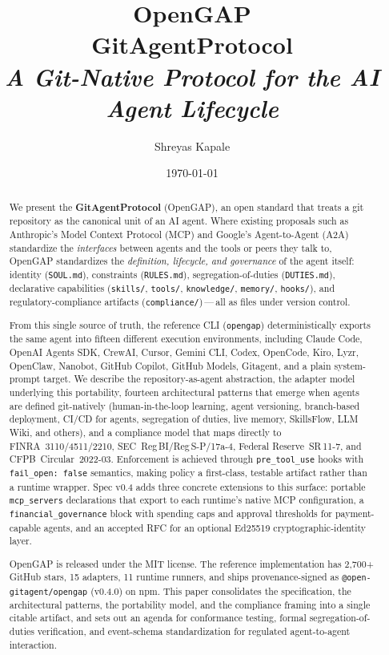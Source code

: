 \documentclass[11pt,a4paper]{article}
\title{\textbf{\Huge OpenGAP} \\[4pt] \large\textbf{GitAgentProtocol} \\[4pt] \normalsize\textit{A Git-Native Protocol for the AI Agent Lifecycle}}
\author[1]{Shreyas Kapale}
\affil[1]{OpenGAP Working Group \\ \texttt{shreyas@lyzr.ai} \\ \href{https://gitagent.sh}{gitagent.sh} \\ \href{https://github.com/open-gitagent/opengap}{github.com/open-gitagent/opengap}}
\date{\today}
\begin{document}
\maketitle

\begin{abstract}
\noindent
We present the \textbf{GitAgentProtocol} (OpenGAP), an open standard that treats a
git repository as the canonical unit of an AI agent. Where existing proposals such as
Anthropic's Model Context Protocol (MCP) and Google's Agent-to-Agent (A2A) standardize
the \emph{interfaces} between agents and the tools or peers they talk to, OpenGAP
standardizes the \emph{definition, lifecycle, and governance} of the agent itself:
identity (\texttt{SOUL.md}), constraints (\texttt{RULES.md}), segregation-of-duties
(\texttt{DUTIES.md}), declarative capabilities (\texttt{skills/}, \texttt{tools/},
\texttt{knowledge/}, \texttt{memory/}, \texttt{hooks/}), and regulatory-compliance
artifacts (\texttt{compliance/})\,---\,all as files under version control.

From this single source of truth, the reference CLI (\texttt{opengap}) deterministically
exports the same agent into fifteen different execution environments, including Claude
Code, OpenAI Agents SDK, CrewAI, Cursor, Gemini CLI, Codex, OpenCode, Kiro, Lyzr,
OpenClaw, Nanobot, GitHub Copilot, GitHub Models, Gitagent, and a plain system-prompt
target. We describe the repository-as-agent abstraction, the adapter model underlying
this portability, fourteen architectural patterns that emerge when agents are defined
git-natively (human-in-the-loop learning, agent versioning, branch-based deployment,
CI/CD for agents, segregation of duties, live memory, SkillsFlow, LLM Wiki, and others),
and a compliance model that maps directly to FINRA~3110/4511/2210,
SEC~Reg\,BI/Reg\,S-P/17a-4, Federal Reserve~SR\,11-7, and CFPB~Circular~2022-03.
Enforcement is achieved through \texttt{pre\_tool\_use} hooks with \texttt{fail\_open:
false} semantics, making policy a first-class, testable artifact rather than a runtime
wrapper. Spec v0.4 adds three concrete extensions to this surface: portable
\texttt{mcp\_servers} declarations that export to each runtime's native MCP
configuration, a \texttt{financial\_governance} block with spending caps and approval
thresholds for payment-capable agents, and an accepted RFC for an optional
Ed25519 cryptographic-identity layer.

OpenGAP is released under the MIT license. The reference implementation has 2{,}700+
GitHub stars, 15 adapters, 11 runtime runners, and ships provenance-signed as
\texttt{@open-gitagent/opengap} (v0.4.0) on npm. This paper consolidates the specification, the
architectural patterns, the portability model, and the compliance framing into a single
citable artifact, and sets out an agenda for conformance testing, formal
segregation-of-duties verification, and event-schema standardization for regulated
agent-to-agent interaction.
\end{abstract}
\end{document}
